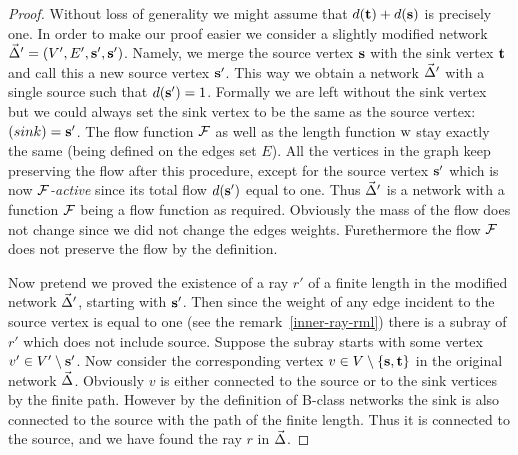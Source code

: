 \documentclass[12pt]{article}
\begin{document}
    \begin{proof}
      Without loss of generality we might assume that $d(\mathbf{t}) + d(\mathbf{s})$ is precisely one.
      In order to make our proof easier we consider a slightly modified network $\vec{\Delta}' = (V', E', \mathbf{s}', \mathbf{s}')$.
      Namely, we merge the source vertex $\mathbf{s}$ with the sink vertex $\mathbf{t}$ and call this a
        new source vertex $\mathbf{s}'$.
      This way we obtain a network $\vec{\Delta}'$ with a single source such that $d(\mathbf{s}') = 1$.
      Formally we are left without the sink vertex but we could always set the sink vertex to be the same as the source vertex: $\mathit(sink)=\mathbf{s}'$.
      The flow function $\mathcal{F}$ as well as the length function $\mathrm{w}$ stay exactly the same (being defined on the edges set $E$).
      All the vertices in the graph keep preserving the flow after this procedure, except for the source vertex $\mathbf{s}'$
        which is now \emph{$\mathcal{F}$-active} since its total flow $d(\mathbf{s}')$ equal to one.
      Thus $\vec{\Delta}'$ is a network with a function $\mathcal{F}$ being a flow function as required.
      Obviously the mass of the flow does not change since we did not change the edges weights.
      Furethermore the flow $\mathcal{F}$ does not preserve the flow by the definition.

      Now pretend we proved the existence of a ray $r'$ of a finite length in the modified network $\vec{\Delta}'$, starting with $\mathbf{s}'$.
      Then since the weight of any edge incident to the source vertex is equal to one (see the remark~\ref{inner-ray-rml})
        there is a subray of $r'$ which does not include source.
      Suppose the subray starts with some vertex $v' \in V' \setminus \mathbf{s}'$.
      Now consider the corresponding vertex $v \in V \setminus \left\{\mathbf{s}, \mathbf{t}\right\}$ in the original network $\vec{\Delta}$.
      Obviously $v$ is either connected to the source or to the sink vertices by the finite path.
      However by the definition of B-class networks the sink is also connected to the source with the path of the finite length.
      Thus it is connected to the source, and we have found the ray $r$ in $\vec{\Delta}$.


\end{proof}
\end{document}
